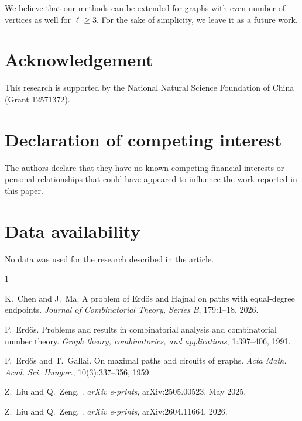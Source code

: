 \documentclass[12pt]{article}%
\begin{document}
We believe that our methods can be extended for graphs with even number of vertices as well for $\ell \ge 3$.
For the sake of simplicity, we leave it as a future work.

\section*{Acknowledgement}
This research is supported by the National Natural Science Foundation of China  (Grant 12571372).

\section*{Declaration of competing interest}
The authors declare that they have no known competing financial interests or personal relationships that could have appeared to influence the work reported in this paper.


\section*{Data availability}
No data was used for the research described in the article.

\begin{thebibliography}{1}

	K.~Chen and J.~Ma.
	\newblock A problem of Erd{\H{o}}s and Hajnal on paths with equal-degree endpoints.
	\newblock \emph{Journal of Combinatorial Theory, Series B}, 179:1--18, 2026.
	
	P.~Erd\H{o}s.
	\newblock Problems and results in combinatorial analysis and combinatorial number theory.
	\newblock \emph{Graph theory, combinatorics, and applications}, 1:397--406, 1991.
	
	P.~Erd\H{o}s and T.~Gallai.
	\newblock On maximal paths and circuits of graphs.
	\newblock \emph{Acta Math. Acad. Sci. Hungar.}, 10(3):337--356, 1959.
	
	Z.~{Liu} and Q.~{Zeng}.
	.
	\newblock \emph{arXiv e-prints}, arXiv:2505.00523, May 2025.
	
	Z.~{Liu} and Q.~{Zeng}.
	.
	\newblock \emph{arXiv e-prints}, arXiv:2604.11664, 2026.
	
	\end{thebibliography}
	
\end{document}
